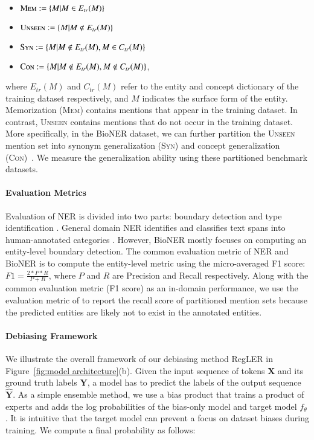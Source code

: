 \documentclass[11pt]{article}
\begin{document}
\begin{itemize}[leftmargin=0.5in]
    \item $\textsc{Mem} := \{ M | M \in E_{tr}(M)\}$
    \item $\textsc{Unseen} := \{M|M \notin {E_{tr}}(M) \}$
    \item $\textsc{Syn} := \{ M | M \notin E_{tr}(M), M \in C_{tr}(M) \}$
    \item $\textsc{Con} := \{ M | M \notin E_{tr}(M), M \notin C_{tr}(M) \}$,
\end{itemize}
where $E_{tr}(M)$ and $C_{tr}(M)$ refer to the entity and concept dictionary of the training dataset respectively, and $M$ indicates the surface form of the entity.
Memorization (\textsc{Mem}) contains mentions that appear in the training dataset.
In contrast, \textsc{Unseen} contains mentions that do not occur in the training dataset.
More specifically, in the BioNER dataset, we can further partition the \textsc{Unseen} mention set into synonym generalization (\textsc{Syn}) and concept generalization (\textsc{Con})~\cite{kim2021your}.
We measure the generalization ability using these partitioned benchmark datasets.

\paragraph{Evaluation Metrics}
Evaluation of NER is divided into two parts: boundary detection and type identification \cite{li2020survey}.
General domain NER identifies and classifies text spans into human-annotated categories \cite{sang2003introduction}.
However, BioNER mostly focuses on computing an entity-level boundary detection.
The common evaluation metric of NER and BioNER is to compute the entity-level metric using the micro-averaged F1 score:
$F1 = \frac{2*P*R}{P+R}$, where $P$ and $R$ are Precision and Recall respectively.
Along with the common evaluation metric (F1 score) as an in-domain performance, we use the evaluation metric of \cite{kim2021your} to report the recall score of partitioned mention sets because the predicted entities are likely not to exist in the annotated entities.


\paragraph{Debiasing Framework}
We illustrate the overall framework of our debiasing method RegLER in Figure~\ref{fig:model architecture}(b).
Given the input sequence of tokens \textbf{X} and its ground truth labels \textbf{Y}, a model has to predict the labels of the output sequence $\hat{\textbf{Y}}$.
As a simple ensemble method, we use a bias product that trains a product of experts \cite{hinton2002training,smith2005logarithmic} and adds the log probabilities of the bias-only model and target model $f_\theta$ \cite{clark2019don,he2019unlearn}.
It is intuitive that the target model can prevent a focus on dataset biases during training.
We compute a final probability as follows:
\end{document}
